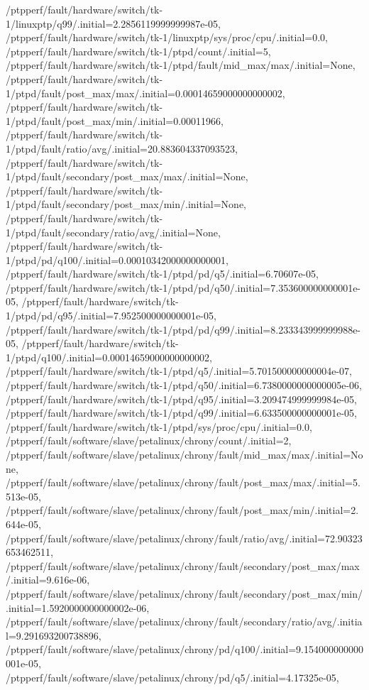 {    /ptpperf/fault/hardware/switch/tk-1/linuxptp/q99/.initial=2.2856119999999987e-05,
    /ptpperf/fault/hardware/switch/tk-1/linuxptp/sys/proc/cpu/.initial=0.0,
    /ptpperf/fault/hardware/switch/tk-1/ptpd/count/.initial=5,
    /ptpperf/fault/hardware/switch/tk-1/ptpd/fault/mid_max/max/.initial=None,
    /ptpperf/fault/hardware/switch/tk-1/ptpd/fault/post_max/max/.initial=0.00014659000000000002,
    /ptpperf/fault/hardware/switch/tk-1/ptpd/fault/post_max/min/.initial=0.00011966,
    /ptpperf/fault/hardware/switch/tk-1/ptpd/fault/ratio/avg/.initial=20.883604337093523,
    /ptpperf/fault/hardware/switch/tk-1/ptpd/fault/secondary/post_max/max/.initial=None,
    /ptpperf/fault/hardware/switch/tk-1/ptpd/fault/secondary/post_max/min/.initial=None,
    /ptpperf/fault/hardware/switch/tk-1/ptpd/fault/secondary/ratio/avg/.initial=None,
    /ptpperf/fault/hardware/switch/tk-1/ptpd/pd/q100/.initial=0.00010342000000000001,
    /ptpperf/fault/hardware/switch/tk-1/ptpd/pd/q5/.initial=6.70607e-05,
    /ptpperf/fault/hardware/switch/tk-1/ptpd/pd/q50/.initial=7.353600000000001e-05,
    /ptpperf/fault/hardware/switch/tk-1/ptpd/pd/q95/.initial=7.952500000000001e-05,
    /ptpperf/fault/hardware/switch/tk-1/ptpd/pd/q99/.initial=8.233343999999988e-05,
    /ptpperf/fault/hardware/switch/tk-1/ptpd/q100/.initial=0.00014659000000000002,
    /ptpperf/fault/hardware/switch/tk-1/ptpd/q5/.initial=5.701500000000004e-07,
    /ptpperf/fault/hardware/switch/tk-1/ptpd/q50/.initial=6.7380000000000005e-06,
    /ptpperf/fault/hardware/switch/tk-1/ptpd/q95/.initial=3.209474999999984e-05,
    /ptpperf/fault/hardware/switch/tk-1/ptpd/q99/.initial=6.633500000000001e-05,
    /ptpperf/fault/hardware/switch/tk-1/ptpd/sys/proc/cpu/.initial=0.0,
    /ptpperf/fault/software/slave/petalinux/chrony/count/.initial=2,
    /ptpperf/fault/software/slave/petalinux/chrony/fault/mid_max/max/.initial=None,
    /ptpperf/fault/software/slave/petalinux/chrony/fault/post_max/max/.initial=5.513e-05,
    /ptpperf/fault/software/slave/petalinux/chrony/fault/post_max/min/.initial=2.644e-05,
    /ptpperf/fault/software/slave/petalinux/chrony/fault/ratio/avg/.initial=72.90323653462511,
    /ptpperf/fault/software/slave/petalinux/chrony/fault/secondary/post_max/max/.initial=9.616e-06,
    /ptpperf/fault/software/slave/petalinux/chrony/fault/secondary/post_max/min/.initial=1.5920000000000002e-06,
    /ptpperf/fault/software/slave/petalinux/chrony/fault/secondary/ratio/avg/.initial=9.291693200738896,
    /ptpperf/fault/software/slave/petalinux/chrony/pd/q100/.initial=9.154000000000001e-05,
    /ptpperf/fault/software/slave/petalinux/chrony/pd/q5/.initial=4.17325e-05,
}
